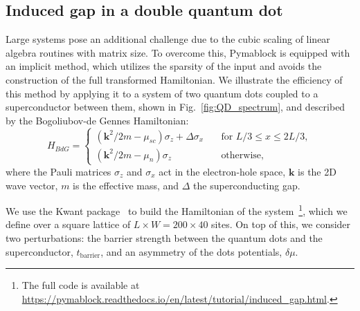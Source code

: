 \subsection{Induced gap in a double quantum dot}

Large systems pose an additional challenge due to the cubic scaling of linear
algebra routines with matrix size.
To overcome this, Pymablock is equipped with an implicit method, which utilizes
the sparsity of the input and avoids the construction of the full transformed
Hamiltonian.
We illustrate the efficiency of this method by applying it to a system of two
quantum dots coupled to a superconductor between them, shown in
Fig.~\ref{fig:QD_spectrum}, and described by the Bogoliubov-de Gennes Hamiltonian:
%
\begin{equation}
    H_{BdG} =
    \begin{cases}
        (\mathbf{k}^2/2m - \mu_{sc}) \sigma_z + \Delta \sigma_x \quad & \text{for } L/3 \leq x \leq 2L/3, \\
        (\mathbf{k}^2/2m - \mu_n) \sigma_z \quad & \text{otherwise},
    \end{cases}
\end{equation}
where the Pauli matrices $\sigma_z$ and $\sigma_x$ act in the electron-hole
space, $\mathbf{k}$ is the 2D wave vector, $m$ is the effective mass, and
$\Delta$ the superconducting gap.

We use the Kwant package~\cite{Groth_2014} to build the Hamiltonian of the
system~\footnote{The full code is available at
\url{https://pymablock.readthedocs.io/en/latest/tutorial/induced_gap.html}.},
which we define over a square lattice of $L \times W = 200 \times 40$ sites.
On top of this, we consider two perturbations: the barrier strength between the
quantum dots and the superconductor, $t_{\text{barrier}}$, and an asymmetry of
the dots potentials, $\delta \mu$.

